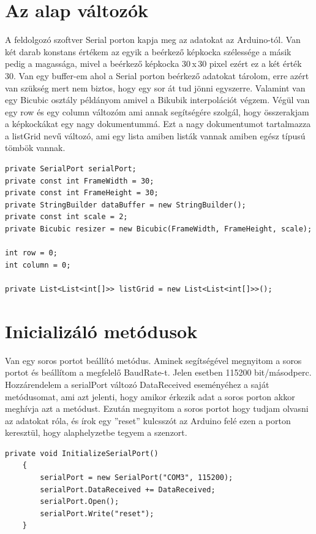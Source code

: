 \documentclass[]{thesis-ekf}
\theoremstyle{definition}
\theoremstyle{remark}
\begin{document}
\section{Az alap változók}
A feldolgozó szoftver Serial porton kapja meg az adatokat az Arduino-tól. Van két darab konstans értékem az egyik a beérkező képkocka szélessége a másik pedig a magassága, mivel a beérkező képkocka 30\,x\,30 pixel ezért ez a két érték 30. Van egy buffer-em ahol a Serial porton beérkező adatokat tárolom, erre azért van szükség mert nem biztos, hogy egy sor át tud jönni egyszerre. Valamint van egy Bicubic osztály példányom amivel a Bikubik interpolációt végzem. Végül van egy row és egy column változóm ami annak segítségére szolgál, hogy összerakjam a képkockákat egy nagy dokumentummá. Ezt a nagy dokumentumot tartalmazza a listGrid nevű változó, ami egy lista amiben listák vannak amiben egész típusú tömbök vannak. 
\begin{lstlisting}[language=CSharp]
private SerialPort serialPort;
private const int FrameWidth = 30; 
private const int FrameHeight = 30; 
private StringBuilder dataBuffer = new StringBuilder(); 
private const int scale = 2;
private Bicubic resizer = new Bicubic(FrameWidth, FrameHeight, scale);

int row = 0;
int column = 0;

private List<List<int[]>> listGrid = new List<List<int[]>>();
\end{lstlisting}

\section{Inicializáló metódusok}
Van egy soros portot beállító metódus. Aminek segítségével megnyitom a soros portot és beállítom a megfelelő BaudRate-t. Jelen esetben 115200 bit/másodperc. Hozzárendelem a serialPort változó DataReceived eseményéhez a saját metódusomat, ami azt jelenti, hogy amikor érkezik adat a soros porton akkor meghívja azt a metódust. Ezután megnyitom a soros portot hogy tudjam olvasni az adatokat róla, és írok egy ''reset'' kulcsszót az Arduino felé ezen a porton keresztül, hogy alaphelyzetbe tegyem a szenzort.
\begin{lstlisting}[language=CSharp]
	private void InitializeSerialPort()
	{
		serialPort = new SerialPort("COM3", 115200);
		serialPort.DataReceived += DataReceived;
		serialPort.Open();
		serialPort.Write("reset");
	}
\end{lstlisting}
\end{document}
